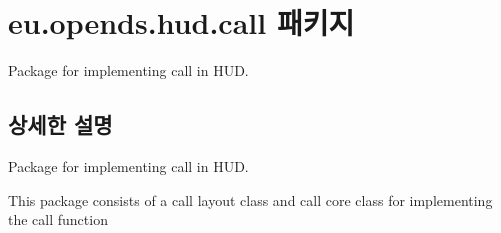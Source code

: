 \hypertarget{namespaceeu_1_1opends_1_1hud_1_1call}{}\section{eu.\+opends.\+hud.\+call 패키지}
\label{namespaceeu_1_1opends_1_1hud_1_1call}


Package for implementing call in H\+U\+D.  




\subsection{상세한 설명}
Package for implementing call in H\+U\+D. 

This package consists of a call layout class and call core class for implementing the call function 